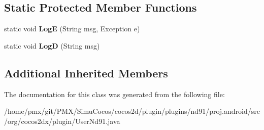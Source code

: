 \subsection*{Static Protected Member Functions}
\begin{DoxyCompactItemize}
\item 
\mbox{\label{classorg_1_1cocos2dx_1_1plugin_1_1UserNd91_a78e52071536580e3b0662bf84bd8a145}} 
static void {\bfseries LogE} (String msg, Exception e)
\item 
\mbox{\label{classorg_1_1cocos2dx_1_1plugin_1_1UserNd91_a23d1f4e8b152e375fe130e0488cd821d}} 
static void {\bfseries LogD} (String msg)
\end{DoxyCompactItemize}
\subsection*{Additional Inherited Members}


The documentation for this class was generated from the following file\+:\begin{DoxyCompactItemize}
\item 
/home/pmx/git/\+P\+M\+X/\+Simu\+Cocos/cocos2d/plugin/plugins/nd91/proj.\+android/src/org/cocos2dx/plugin/User\+Nd91.\+java\end{DoxyCompactItemize}
